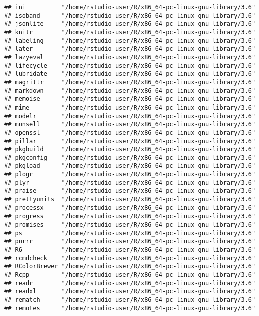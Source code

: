 \documentclass[]{book}
\begin{document}
\begin{verbatim}
## ini          "/home/rstudio-user/R/x86_64-pc-linux-gnu-library/3.6"
## isoband      "/home/rstudio-user/R/x86_64-pc-linux-gnu-library/3.6"
## jsonlite     "/home/rstudio-user/R/x86_64-pc-linux-gnu-library/3.6"
## knitr        "/home/rstudio-user/R/x86_64-pc-linux-gnu-library/3.6"
## labeling     "/home/rstudio-user/R/x86_64-pc-linux-gnu-library/3.6"
## later        "/home/rstudio-user/R/x86_64-pc-linux-gnu-library/3.6"
## lazyeval     "/home/rstudio-user/R/x86_64-pc-linux-gnu-library/3.6"
## lifecycle    "/home/rstudio-user/R/x86_64-pc-linux-gnu-library/3.6"
## lubridate    "/home/rstudio-user/R/x86_64-pc-linux-gnu-library/3.6"
## magrittr     "/home/rstudio-user/R/x86_64-pc-linux-gnu-library/3.6"
## markdown     "/home/rstudio-user/R/x86_64-pc-linux-gnu-library/3.6"
## memoise      "/home/rstudio-user/R/x86_64-pc-linux-gnu-library/3.6"
## mime         "/home/rstudio-user/R/x86_64-pc-linux-gnu-library/3.6"
## modelr       "/home/rstudio-user/R/x86_64-pc-linux-gnu-library/3.6"
## munsell      "/home/rstudio-user/R/x86_64-pc-linux-gnu-library/3.6"
## openssl      "/home/rstudio-user/R/x86_64-pc-linux-gnu-library/3.6"
## pillar       "/home/rstudio-user/R/x86_64-pc-linux-gnu-library/3.6"
## pkgbuild     "/home/rstudio-user/R/x86_64-pc-linux-gnu-library/3.6"
## pkgconfig    "/home/rstudio-user/R/x86_64-pc-linux-gnu-library/3.6"
## pkgload      "/home/rstudio-user/R/x86_64-pc-linux-gnu-library/3.6"
## plogr        "/home/rstudio-user/R/x86_64-pc-linux-gnu-library/3.6"
## plyr         "/home/rstudio-user/R/x86_64-pc-linux-gnu-library/3.6"
## praise       "/home/rstudio-user/R/x86_64-pc-linux-gnu-library/3.6"
## prettyunits  "/home/rstudio-user/R/x86_64-pc-linux-gnu-library/3.6"
## processx     "/home/rstudio-user/R/x86_64-pc-linux-gnu-library/3.6"
## progress     "/home/rstudio-user/R/x86_64-pc-linux-gnu-library/3.6"
## promises     "/home/rstudio-user/R/x86_64-pc-linux-gnu-library/3.6"
## ps           "/home/rstudio-user/R/x86_64-pc-linux-gnu-library/3.6"
## purrr        "/home/rstudio-user/R/x86_64-pc-linux-gnu-library/3.6"
## R6           "/home/rstudio-user/R/x86_64-pc-linux-gnu-library/3.6"
## rcmdcheck    "/home/rstudio-user/R/x86_64-pc-linux-gnu-library/3.6"
## RColorBrewer "/home/rstudio-user/R/x86_64-pc-linux-gnu-library/3.6"
## Rcpp         "/home/rstudio-user/R/x86_64-pc-linux-gnu-library/3.6"
## readr        "/home/rstudio-user/R/x86_64-pc-linux-gnu-library/3.6"
## readxl       "/home/rstudio-user/R/x86_64-pc-linux-gnu-library/3.6"
## rematch      "/home/rstudio-user/R/x86_64-pc-linux-gnu-library/3.6"
## remotes      "/home/rstudio-user/R/x86_64-pc-linux-gnu-library/3.6"

\end{verbatim}
\end{document}
